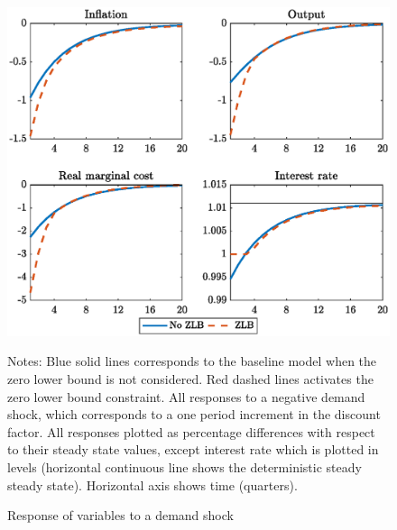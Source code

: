 \documentclass[11pt]{article}
\numberwithin{equation}{section}
\begin{document}
\begin{figure}[H]
	\centering
	\caption{Response of variables to a demand shock}\label{fig:irfLevel_pref}
	\includegraphics[scale=.6]{irfLevel_pref}
	\begin{minipage}{\linewidth}
    	\vspace{1mm}
	\footnotesize{{\sc Notes:} Blue solid lines corresponds to the baseline model when the zero lower bound is not considered. Red dashed lines activates the zero lower bound constraint. All responses to a negative demand shock, which corresponds to a one period increment in the discount factor. All responses plotted as percentage differences with respect to their steady state values, except interest rate which is plotted in levels (horizontal continuous line shows the deterministic steady steady state). Horizontal axis shows time (quarters).}
	\end{minipage}
\end{figure}
\end{document}
